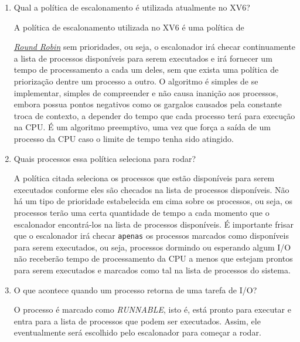 \documentclass{article}
\begin{document}
\begin{enumerate}
      \item Qual a política de escalonamento é utilizada atualmente no XV6?

            A política de escalonamento utilizada no XV6 é uma política de

            \href{https://en.wikipedia.org/wiki/Round-robin_scheduling}{\textit{Round
                        Robin}} sem prioridades, ou seja, o escalonador irá
            checar
            continuamente a lista de processos disponíveis para serem
            executados e irá
            fornecer um tempo de processamento a cada um deles, sem que exista
            uma política de priorização dentre um processo a outro. O algoritmo
            é
            simples de se implementar, simples de compreender e não causa
            inanição aos
            processos, embora possua pontos negativos como os gargalos causados
            pela
            constante troca de contexto, a depender do tempo que cada processo
            terá para
            execução na CPU. É um algoritmo preemptivo, uma vez que força a
            saída de um processo da CPU caso o limite de tempo tenha sido
            atingido.\@

      \item Quais processos essa política seleciona para rodar?

            A política citada seleciona os processos que estão disponíveis para
            serem executados conforme eles são checados na lista de processos
            disponíveis.
            Não há um tipo de prioridade estabelecida em cima sobre os
            processos, ou seja, os processos terão uma certa quantidade de
            tempo a cada
            momento que o escalonador encontrá-los na lista de processos
            disponíveis. É
            importante frisar que o escalonador irá checar \texttt{apenas} os
            processos marcados como disponíveis para serem executados, ou seja,
            processos dormindo ou esperando algum I/O não receberão tempo de
            processamento
            da CPU a menos que estejam prontos para serem executados e marcados
            como tal na
            lista de processos do sistema.

      \item O que acontece quando um processo retorna de uma tarefa de I/O?

            O processo é marcado como \textit{RUNNABLE}, isto é, está pronto
            para executar e entra para a lista de processos que podem ser
            executados.
            Assim, ele eventualmente será escolhido pelo escalonador para
            começar a rodar.


\end{enumerate}
\end{document}
